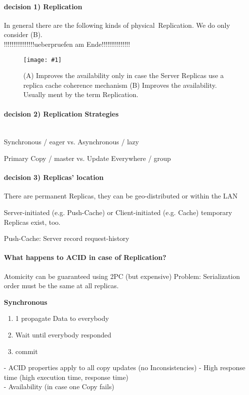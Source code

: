 \documentclass[a4paper,12pt]{article}%
\newcommand{\grafik}[2]{\begin{figure}[!htb]
		\noindent\texttt{[image: \#1]}
		\caption{\textrm{#2}}%
	\end{figure}}
\newif\ifcomment
\begin{document}
\paragraph{decision 1) Replication}
In general there are the following kinds of \glqq physical\grqq ~Replication. We do only consider (B).\\
\color{red} !!!!!!!!!!!!!!!!ueberpruefen am Ende!!!!!!!!!!!!!!! \color{black}
\grafik{src/Grafik01}{(A) Improves the availability only in case the Server Replicas use a replica cache coherence mechanism
	(B) Improves the availability. Usually ment by the term \glqq Replication\grqq.}
\paragraph{decision 2) Replication Strategies}~\\
Synchronous / eager vs. Asynchronous / lazy

Primary Copy / master vs. Update Everywhere / group

\paragraph{decision 3) Replicas' location}
There are permanent Replicas, they can be geo-distributed or within the LAN

Server-initiated (e.g. Push-Cache) or Client-initiated (e.g. Cache) temporary Replicas exist, too.

Push-Cache: Server record request-history

\paragraph{What happens to ACID in case of Replication?}
Atomicity can be guaranteed using 2PC (but expensive)
Problem: Serialization order must be the same at all replicas.



\ifcomment
{\bf Synchronous} 


\begin{enumerate}
 \item 1 propagate Data  to everybody
 \item Wait until everybody responded 
 \item commit        
\end{enumerate}

 {\color[HTML]{9AB299} 
- ACID properties apply to all copy updates (no Inconsistencies)}    
{\color[HTML]{A38C8C} -  High response time (high execution time, response time)\\
- Availability (in case one Copy fails)}
\end{document}
